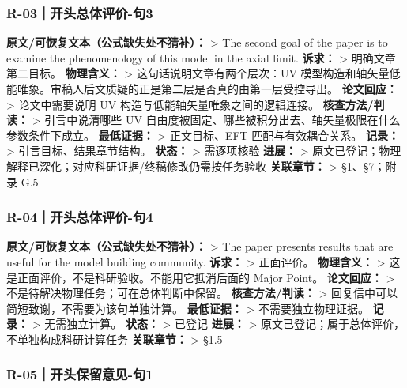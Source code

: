 \documentclass[
  chinese,
  UTF8]{ctexart}
\begin{document}
\subsubsection{R-03｜开头总体评价-句3}\label{r-03ux5f00ux5934ux603bux4f53ux8bc4ux4ef7-ux53e53}

\textbf{原文/可恢复文本（公式缺失处不猜补）：} \textgreater{} The second
goal of the paper is to examine the phenomenology of this model in the
axial limit. \textbf{诉求：} \textgreater{} 明确文章第二目标。
\textbf{物理含义：} \textgreater{} 这句话说明文章有两个层次：UV
模型构造和轴矢量低能唯象。审稿人后文质疑的正是第二层是否真的由第一层受控导出。
\textbf{论文回应：} \textgreater{} 论文中需要说明 UV
构造与低能轴矢量唯象之间的逻辑连接。 \textbf{核查方法/判读：}
\textgreater{} 引言中说清哪些 UV
自由度被固定、哪些被积分出去、轴矢量极限在什么参数条件下成立。
\textbf{最低证据：} \textgreater{} 正文目标、EFT 匹配与有效耦合关系。
\textbf{记录：} \textgreater{} 引言目标、结果章节结构。 \textbf{状态：}
\textgreater{} 需逐项核验 \textbf{进展：} \textgreater{}
原文已登记；物理解释已深化；对应科研证据/终稿修改仍需按任务验收
\textbf{关联章节：} \textgreater{} §1、§7；附录 G.5

\subsubsection{R-04｜开头总体评价-句4}\label{r-04ux5f00ux5934ux603bux4f53ux8bc4ux4ef7-ux53e54}

\textbf{原文/可恢复文本（公式缺失处不猜补）：} \textgreater{} The paper
presents results that are useful for the model building community.
\textbf{诉求：} \textgreater{} 正面评价。 \textbf{物理含义：}
\textgreater{} 这是正面评价，不是科研验收。不能用它抵消后面的 Major
Point。 \textbf{论文回应：} \textgreater{}
不是待解决物理任务；可在总体判断中保留。 \textbf{核查方法/判读：}
\textgreater{} 回复信中可以简短致谢，不需要为该句单独计算。
\textbf{最低证据：} \textgreater{} 不需要独立物理证据。 \textbf{记录：}
\textgreater{} 无需独立计算。 \textbf{状态：} \textgreater{} 已登记
\textbf{进展：} \textgreater{}
原文已登记；属于总体评价，不单独构成科研计算任务 \textbf{关联章节：}
\textgreater{} §1.5

\subsubsection{R-05｜开头保留意见-句1}\label{r-05ux5f00ux5934ux4fddux7559ux610fux89c1-ux53e51}
\end{document}
